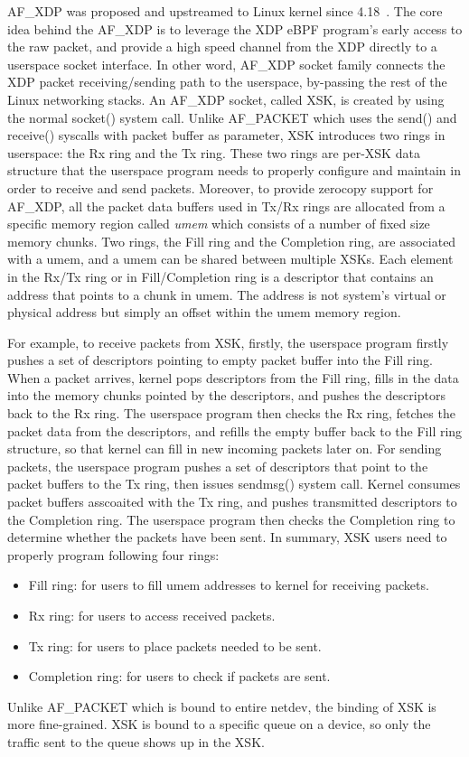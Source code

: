 \documentclass[10pt,numbers,reprint]{sigplanconf}
\begin{document}
AF\_XDP was proposed and upstreamed to Linux kernel since 4.18~\cite{af_xdp_lwn}.
The core idea behind the AF\_XDP is to leverage the XDP eBPF program's
early access to the raw packet, and provide a high speed channel from the XDP
directly to a userspace socket interface. In other word, AF\_XDP socket family
connects the XDP packet receiving/sending path to the userspace, by-passing the
rest of the Linux networking stacks.
An AF\_XDP socket, called XSK, is created by using the normal socket() system
call. Unlike AF\_PACKET which uses the send() and receive() syscalls with packet
buffer as parameter, XSK introduces two rings in userspace: the Rx ring and the
Tx ring. These two rings are per-XSK data structure that the userspace program
needs to properly configure and maintain in order to receive and send packets.
Moreover, to provide zerocopy support for AF\_XDP, all the packet data buffers
used in Tx/Rx rings are allocated from a specific memory region called {\em umem}
which consists of a number of fixed size memory chunks.
Two rings, the Fill ring and the Completion ring, are associated with a umem,
and a umem can be shared between multiple XSKs.
Each element in the Rx/Tx ring or in Fill/Completion ring is a descriptor that
contains an address that points to a chunk in umem. The address is not system's
virtual or physical address but simply an offset within the umem memory
region.

For example, to receive packets from XSK, firstly, the userspace program firstly
pushes a set of descriptors pointing to empty packet buffer into the Fill ring.
When a packet
arrives, kernel pops descriptors from the Fill ring, fills in the data into the
memory chunks pointed by the descriptors, and pushes the descriptors back to
the Rx ring.
The userspace program then checks the Rx ring, fetches the packet data from the
descriptors, and refills the empty buffer back to the Fill ring structure, so
that kernel can fill in new incoming packets later on.
For sending packets, the userspace program pushes a set of descriptors that
point to the packet buffers to the Tx ring, then issues sendmsg() system call.
Kernel consumes packet buffers asscoaited with the Tx ring, and pushes
transmitted descriptors to the Completion ring.
The userspace program then checks the Completion ring to determine whether the
packets have been sent.
In summary, XSK users need to properly program following four rings:
\begin{itemize}
\item Fill ring: for users to fill umem addresses to kernel for receiving packets.
\item Rx ring: for users to access received packets.
\item Tx ring: for users to place packets needed to be sent.
\item Completion ring: for users to check if packets are sent.
\end{itemize}
Unlike AF\_PACKET which is bound to entire netdev, the binding of XSK is more
fine-grained. XSK is bound to a specific queue on a device, so only the
traffic sent to the queue shows up in the XSK.
\end{document}
